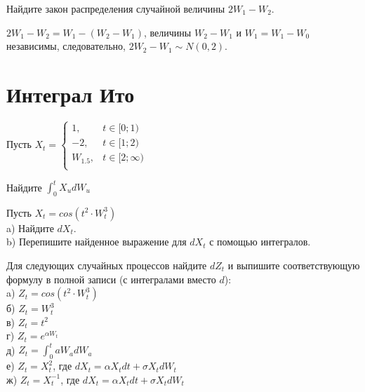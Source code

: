 \begin{problem}
Найдите закон распределения случайной величины $2W_1-W_2$.

\begin{sol}
$2W_1-W_2=W_1-(W_2-W_1)$, величины $W_2-W_1$ и $W_1=W_1-W_0$ независимы, следовательно, $2W_2-W_1\sim N(0,2)$.
\end{sol}
\end{problem}


\section{Интеграл Ито}

\begin{problem}
Пусть $X_{t}=
\begin{cases}
1, & t\in[0;1) \\
-2, & t\in[1;2) \\
W_{1.5},& t\in[2;\infty) \\
\end{cases}$

Найдите $\int_{0}^{t}X_{u}dW_{u}$

\begin{sol}

\end{sol}
\end{problem}

\begin{problem}
Пусть $X_{t}=cos(t^{2}\cdot W_{t}^{3})$ \\
a) Найдите $dX_{t}$.\\
b) Перепишите найденное выражение для $dX_{t}$ с помощью интегралов.

\begin{sol}

\end{sol}
\end{problem}

\begin{problem}
 Для следующих случайных процессов найдите $dZ_{t}$ и выпишите соответствующую формулу в полной записи (с интегралами вместо $d$): \\
a) $Z_{t}=cos(t^{2}\cdot W_{t}^{3})$ \\
б) $Z_{t}=W^{3}_{t}$ \\
в) $Z_{t}=t^{2}$ \\
г) $Z_{t}=e^{\alpha W_{t}}$ \\
д) $Z_{t}=\int_{0}^{t} aW_{a}dW_{a}$ \\
е) $Z_{t}=X^{2}_{t}$, где $dX_{t}=\alpha X_{t}dt+\sigma X_{t}dW_{t}$ \\
ж) $Z_{t}=X^{-1}_{t}$, где $dX_{t}=\alpha X_{t}dt+\sigma X_{t}dW_{t}$

\begin{sol}

\end{sol}
\end{problem}

